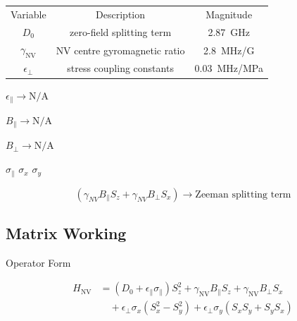 \begin{table}
    \centering
    \begin{tabular}{ccc}
        Variable & Description & Magnitude \\
       $D_0$  & zero-field splitting term & 2.87~GHz\\
       $\gamma_{\text{NV}}$ & NV centre gyromagnetic ratio & 2.8~MHz/G\\
       $\epsilon_{\perp}$   & stress coupling constants & 0.03~MHz/MPa\\
    \end{tabular}
\end{table}

$\epsilon_{\parallel} \rightarrow \text{N/A}$

$B_{\parallel} \rightarrow \text{N/A}$

$B_{\perp} \rightarrow \text{N/A}$
 
$\sigma_{\parallel}$
$\sigma_x$
$\sigma_y$

\[(\gamma_{NV}B_{\parallel}S_z + \gamma_{NV}B_{\perp}S_x) \rightarrow \text{Zeeman splitting term}
\]









\subsection*{Matrix Working} 
\par 
Operator Form


\begin{align}
H_{\text{NV}} &= \left(D_0 + \epsilon_{\parallel}\sigma_{\parallel}\right)S_z^2 
+ \gamma_{\text{NV}}B_{\parallel}S_z 
+ \gamma_{\text{NV}}B_{\perp}S_x \nonumber \\
&\quad + \epsilon_{\perp}\sigma_x(S_x^2 - S_y^2) 
+ \epsilon_{\perp}\sigma_y(S_xS_y + S_yS_x)
\end{align}

